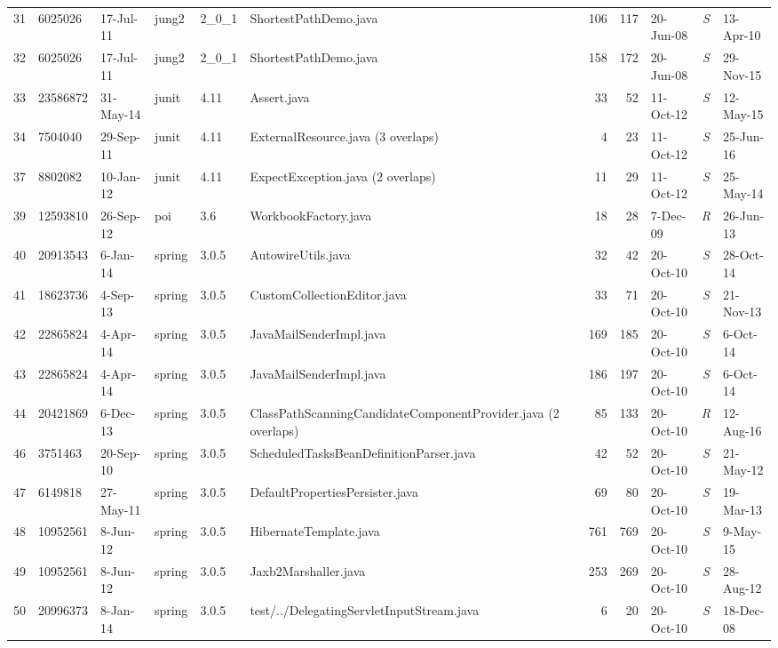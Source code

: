 \documentclass[sigconf,review, anonymous]{acmart}
\begin{document}
\begin{table}
{\begin{tabular}{r|l|l|l|l|p{5.2cm}|r|r|l|c|l}
			31 & 6025026 & 17-Jul-11 & jung2 & 2\_0\_1  & ShortestPathDemo.java & 106 & 117 & 20-Jun-08 & \textit{S} & 13-Apr-10 \\
			32 & 6025026 & 17-Jul-11 & jung2 & 2\_0\_1  & ShortestPathDemo.java & 158 & 172 & 20-Jun-08 & \textit{S} & 29-Nov-15 \\
			33 & 23586872 & 31-May-14 & junit & 4.11 & Assert.java & 33 & 52 & 11-Oct-12 & \textit{S} & 12-May-15 \\
			34 & 7504040 & 29-Sep-11 & junit & 4.11 & ExternalResource.java (3 overlaps) & 4 & 23 & 11-Oct-12 & \textit{S} & 25-Jun-16 \\
			37 & 8802082 & 10-Jan-12 & junit & 4.11 & ExpectException.java (2 overlaps) & 11 & 29 & 11-Oct-12 & \textit{S} & 25-May-14 \\
			39 & 12593810 & 26-Sep-12 & poi & 3.6 & WorkbookFactory.java & 18 & 28 & 7-Dec-09 & \textit{R} & 26-Jun-13 \\
			40 & 20913543 & 6-Jan-14 & spring & 3.0.5  & AutowireUtils.java & 32 & 42 & 20-Oct-10 & \textit{S} & 28-Oct-14 \\
			41 & 18623736 & 4-Sep-13 & spring & 3.0.5  & CustomCollectionEditor.java & 33 & 71 & 20-Oct-10 & \textit{S} & 21-Nov-13 \\
			42 & 22865824 & 4-Apr-14 & spring & 3.0.5  & JavaMailSenderImpl.java & 169 & 185 & 20-Oct-10 & \textit{S} & 6-Oct-14 \\
			43 & 22865824 & 4-Apr-14 & spring & 3.0.5  & JavaMailSenderImpl.java & 186 & 197 & 20-Oct-10 & \textit{S} & 6-Oct-14 \\
			44 & 20421869 & 6-Dec-13 & spring & 3.0.5  & ClassPathScanningCandidateComponent\newline Provider.java (2 overlaps) & 85 & 133 & 20-Oct-10 & \textit{R} & 12-Aug-16 \\
			46 & 3751463 & 20-Sep-10 & spring & 3.0.5  & ScheduledTasksBeanDefinitionParser.java & 42 & 52 & 20-Oct-10 & \textit{S} & 21-May-12 \\
			47 & 6149818 & 27-May-11 & spring & 3.0.5  & DefaultPropertiesPersister.java & 69 & 80 & 20-Oct-10 & \textit{S} & 19-Mar-13 \\
			48 & 10952561 & 8-Jun-12 & spring & 3.0.5  & HibernateTemplate.java & 761 & 769 & 20-Oct-10 & \textit{S} & 9-May-15 \\
			49 & 10952561 & 8-Jun-12 & spring & 3.0.5  & Jaxb2Marshaller.java & 253 & 269 & 20-Oct-10 & \textit{S} & 28-Aug-12 \\
			50 & 20996373 & 8-Jan-14 & spring & 3.0.5  & test/../DelegatingServletInputStream.java & 6 & 20 & 20-Oct-10 & \textit{S} & 18-Dec-08 \\

\end{tabular}}
\end{table}
\end{document}
